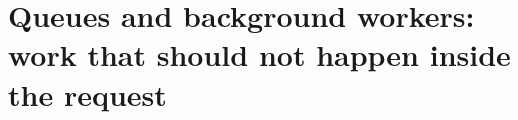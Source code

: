\chapter{Queues and background workers: work that should not happen inside the request}
\label{ch:queues-and-background-workers-work-that}

